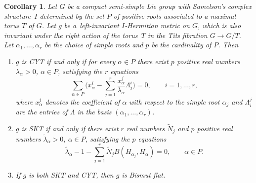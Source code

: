 \documentclass[pdftex]{sigma}
\numberwithin{equation}{section}
\newtheorem{Corollary}[Theorem]{Corollary}
\begin{document}
\begin{Corollary} \label{coroBismutflat}
Let $G$ be a compact semi-simple Lie group with Samelson's complex structure~$I$ determined by the set $P$ of positive roots associated to a maximal torus $T$ of $G$. Let $g$ be a~left-invariant $I$-Hermitian metric on $G$, which is also invariant under the right action of the torus~$T$ in the Tits fibration $G\rightarrow G/T$. Let $\alpha_1, \dots,\alpha_r$ be the choice of simple roots and $p$ be the cardinality of $P$.
Then
\begin{enumerate}
 \item[$(i)$] $g$ is CYT if and only if for every $\alpha \in P$ there exist $p$ positive real numbers $\lambda_{\alpha} > 0$, $\alpha \in P$, satisfying the $r$ equations
\begin{equation}\label{CYTsystem}
\sum_{\alpha \in P} \Bigg( x_\alpha^i - \sum_{j=1}^r \frac{x_\alpha^j}{\lambda_{\alpha}} \Lambda^i_j \Bigg) =0, \qquad i = 1, \dots, r,
\end{equation}
where $x_{\alpha}^j$ denotes the coefficient of $\alpha$ with respect to the simple root $\alpha_j$ and $\Lambda_i^j$ are the entries of $\Lambda$ in the basis $(\alpha_1, \dots,\alpha_r)$.
 \item[$(ii)$] $g$ is SKT if and only if there exist $r$ real numbers $ \tilde N_j$ and $p$ positive real numbers $ \tilde \lambda_{\alpha} >0$, $\alpha \in P$, satisfying the $p$ equations
\begin{equation}\label{SKTsystem}
\tilde \lambda_{\alpha} - 1 - \sum_{j = 1}^r \tilde N_j B(H_{\alpha_j}, H_{\alpha})=0, \qquad \alpha \in P.
\end{equation}
 \item[$(iii)$] If $g$ is both SKT and CYT, then $g$ is Bismut flat.
 \end{enumerate}
\end{Corollary}
\end{document}
